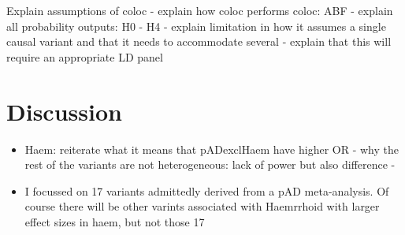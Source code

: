 Explain assumptions of coloc - explain how coloc performs coloc: ABF - explain all probability outputs: H0 - H4 - explain limitation in how it assumes a single causal variant and that it needs to accommodate several - explain that this will require an appropriate LD panel 



\section{Discussion}
\begin{itemize}
  \item Haem: reiterate what it means that pADexclHaem have higher OR - why the rest of the variants are not heterogeneous: lack of power but also difference - 
  \item I focussed on 17 variants admittedly derived from a pAD meta-analysis. Of course there will be other varints associated with Haemrrhoid with larger effect sizes in haem, but not those 17
\end{itemize}